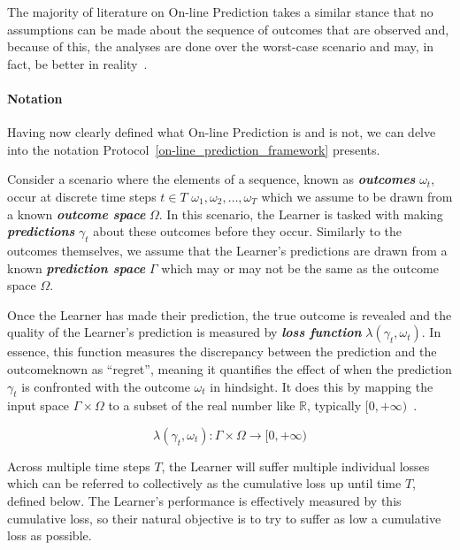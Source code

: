 The majority of literature on On-line Prediction takes a similar stance that no assumptions can be made about the sequence of outcomes that are observed and, because of this, the analyses are done over the worst-case scenario and may, in fact, be better in reality~\cite{cesa-bianchi:1997}.

\paragraph{Notation}\label{paragraph:notation}
Having now clearly defined what On-line Prediction is and is not, we can delve into the notation Protocol~\ref{on-line_prediction_framework} presents.

Consider a scenario where the elements of a sequence, known as \textbf{\textit{outcomes}} $\omega_t$, occur at discrete time steps $t \in T$ $\omega_1, \omega_2, \ldots, \omega_T$ which we assume to be drawn from a known \textbf{\textit{outcome space}} $\Omega$. In this scenario, the Learner is tasked with making \textbf{\textit{predictions}} $\gamma_t$ about these outcomes before they occur. Similarly to the outcomes themselves, we assume that the Learner's predictions are drawn from a known \textbf{\textit{prediction space}} $\Gamma$ which may or may not be the same as the outcome space $\Omega$.

Once the Learner has made their prediction, the true outcome is revealed and the quality of the Learner's prediction is measured by \textbf{\textit{loss function}} $\lambda(\gamma_t, \omega_t)$. In essence, this function measures the discrepancy between the prediction and the outcome\textemdash{}known as ``regret'', meaning it quantifies the effect of when the prediction $\gamma_t$ is confronted with the outcome $\omega_t$ in hindsight. It does this by mapping the input space $\Gamma \times \Omega$ to a subset of the real number like $\mathbb{R}$, typically $[0, +\infty)$~\cite{kalnishkan:2009}.

\begin{equation}
    \lambda(\gamma_t, \omega_t): \Gamma \times \Omega \rightarrow [0, +\infty)
\end{equation}

Across multiple time steps $T$, the Learner will suffer multiple individual losses which can be referred to collectively as the cumulative loss up until time $T$, defined below. The Learner's performance is effectively measured by this cumulative loss, so their natural objective is to try to suffer as low a cumulative loss as possible.

